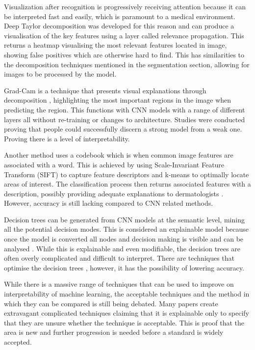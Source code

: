 \documentclass[12pt]{report}
\begin{document}
Visualization after recognition is progressively receiving attention \cite{Yan2019a} because it can be interpreted fast and easily, which is paramount to a medical environment. Deep Taylor decomposition was developed for this reason and can produce a visualisation of the key features using a layer called relevance propagation. This returns a heatmap visualising the most relevant features located in image, showing false positives which are otherwise hard to find. This has similarities to the decomposition techniques mentioned in the segmentation section, allowing for images to be processed by the model.

Grad-Cam is a technique that presents visual explanations through decomposition \cite{Selvaraju2016}, highlighting the most important regions in the image when predicting the region. This functions with CNN models with a range of different layers all without re-training or changes to architecture. Studies were conducted proving that people could successfully discern a strong model from a weak one. Proving there is a level of interpretability.

Another method uses a codebook which is when common image features are associated with a word. This is achieved by using Scale-Invariant Feature Transform (SIFT) to capture feature descriptors and k-means to optimally locate areas of interest. The classification process then returns associated features with a description, possibly providing adequate explanations to dermatologists \cite{Hu2019a}. However, accuracy is still lacking compared to CNN related methods.

Decision trees can be generated from CNN models at the semantic level, mining all the potential decision modes. This is considered an explainable model because once the model is converted all nodes and decision making is visible and can be analysed \cite{Zhang2019}. While this is explainable and even modifiable, the decision trees are often overly complicated and difficult to interpret. There are techniques that optimise the decision trees \cite{Lundberg}, however, it has the possibility of lowering accuracy.

While there is a massive range of techniques that can be used to improve on interpretability of machine learning, the acceptable techniques and the method in which they can be compared is still being debated. Many papers create extravagant complicated techniques claiming that it is explainable only to specify that they are unsure whether the technique is acceptable. This is proof that the area is new and further progression is needed before a standard is widely accepted.
\end{document}
